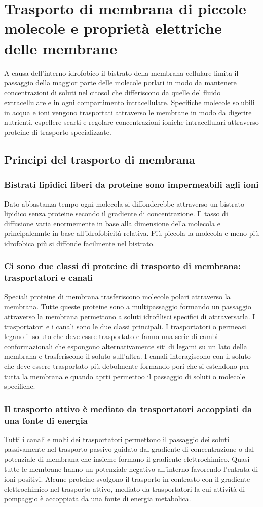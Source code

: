 \chapter{Trasporto di membrana di piccole molecole e propriet\`a elettriche delle membrane}
A causa dell'interno idrofobico il bistrato della membrana cellulare limita il passaggio della maggior parte delle molecole porlari in modo da mantenere
concentrazioni di soluti nel citosol che differiscono da quelle del fluido extracellulare e in ogni compartimento intracellulare. Specifiche molecole solubili in acqua e ioni vengono
trasportati attraverso le membrane in modo da digerire nutrienti, espellere scarti e regolare concentrazioni ioniche intracellulari attraverso proteine di trasporto specializzate. 
\section{Principi del trasporto di membrana}
\subsection{Bistrati lipidici liberi da proteine sono impermeabili agli ioni}
Dato abbastanza tempo ogni molecola si diffonderebbe attraverso un bistrato lipidico senza proteine secondo il gradiente di concentrazione. Il tasso di diffusione varia enormemente in 
base alla dimensione della molecola e principalemnte in base all'idrofobicit\`a relativa. Pi\`u piccola la molecola e meno pi\`u idrofobica pi\`u si diffonde facilmente nel bistrato.
\subsection{Ci sono due classi di proteine di trasporto di membrana: trasportatori e canali}
Speciali proteine di membrana trasferiscono molecole polari attraverso la membrana. Tutte queste proteine sono a multipassaggio formando un passaggio attraverso la membrana permettono a
soluti idrofilisci specifici di attraversarla. I trasportatori e i canali sono le due classi principali. I trasportatori o permeasi legano il soluto che deve essre trasportato e fanno 
una serie di cambi conformazionali che espongono alternativamente siti di legami su un lato della membrana e trasferiscono il soluto sull'altra. I canali interagiscono con il soluto 
che deve essere trasportato pi\`u debolmente formando pori che si estendono per tutta la membrana e quando aprti permettoo il passaggio di soluti o molecole specifiche. 
\subsection{Il trasporto attivo \`e mediato da trasportatori accoppiati da una fonte di energia}
Tutti i canali e molti dei trasportatori permettono il passaggio dei soluti passivamente nel trasporto passivo guidato dal gradiente di concentrazione o dal potenziale di membrana che
insieme formano il gradiente elettrochimico. Quasi tutte le membrane hanno un potenziale negativo all'interno favorendo l'entrata di ioni positivi. Alcune proteine svolgono il trasporto
in contrasto con il gradiente elettrochimico nel trasporto attivo, mediato da trasportatori la cui attivit\`a di pompaggio \`e accoppiata da una fonte di energia metabolica. 
